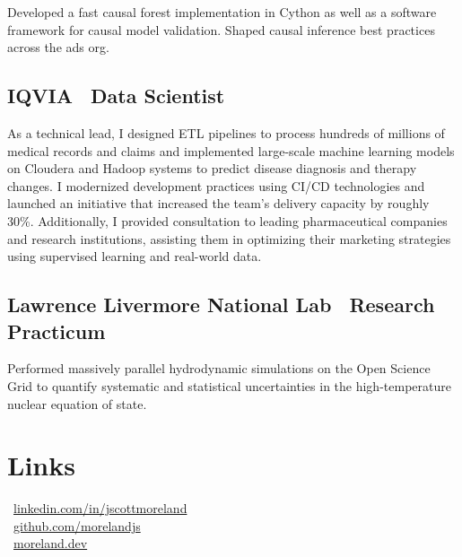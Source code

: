 \documentclass[letterpaper,10pt]{article}
\begin{document}
\begin{multicols}{2}
Developed a fast causal forest implementation in Cython as well as a software
framework for causal model validation. Shaped causal inference best
practices across the ads org.

\subsection{IQVIA \textbar\ Data Scientist}
\smallskip

As a technical lead, I designed ETL pipelines to process hundreds of millions
of medical records and claims and implemented large-scale machine learning models
on Cloudera and Hadoop systems to predict disease diagnosis and therapy changes.
I modernized development practices using CI/CD technologies and launched
an initiative that increased the team's delivery capacity by roughly 30\%.
Additionally, I provided consultation to leading pharmaceutical companies and
research institutions, assisting them in optimizing their marketing strategies
using supervised learning and real-world data.

\subsection{Lawrence Livermore National Lab \textbar\ Research Practicum}
\smallskip

Performed massively parallel hydrodynamic simulations on the Open Science Grid
to quantify systematic and statistical uncertainties in the high-temperature
nuclear equation of state.

\section{Links}

 \textbar\ \href{https://www.linkedin.com/in/jscottmoreland}{linkedin.com/in/jscottmoreland}\\[1ex]
 \textbar\ \href{https://github.com/morelandjs}{github.com/morelandjs}\\[1ex]
 \textbar\ \href{https://moreland.dev}{moreland.dev}\\

\end{multicols}
\end{document}
